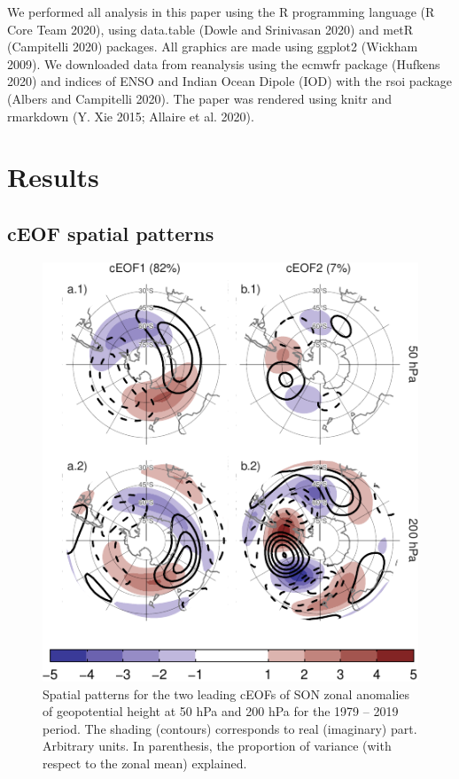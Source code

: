 \documentclass[smallextended]{svjour3}       %
\begin{document}
We performed all analysis in this paper using the R programming language (R Core Team 2020), using data.table (Dowle and Srinivasan 2020) and metR (Campitelli 2020) packages.
All graphics are made using ggplot2 (Wickham 2009).
We downloaded data from reanalysis using the ecmwfr package (Hufkens 2020) and indices of ENSO and Indian Ocean Dipole (IOD) with the rsoi package (Albers and Campitelli 2020).
The paper was rendered using knitr and rmarkdown (Y. Xie 2015; Allaire et al. 2020).

\hypertarget{results}{%
\section{Results}\label{results}}

\hypertarget{spatial}{%
\subsection{cEOF spatial patterns}\label{spatial}}

\begin{figure}
\centering
\includegraphics{../figures/ceofs-1-1.pdf}
\caption{\label{fig:ceofs-1}Spatial patterns for the two leading cEOFs of SON zonal anomalies of geopotential height at 50 hPa and 200 hPa for the 1979 -- 2019 period. The shading (contours) corresponds to real (imaginary) part. Arbitrary units. In parenthesis, the proportion of variance (with respect to the zonal mean) explained.}
\end{figure}
\end{document}
